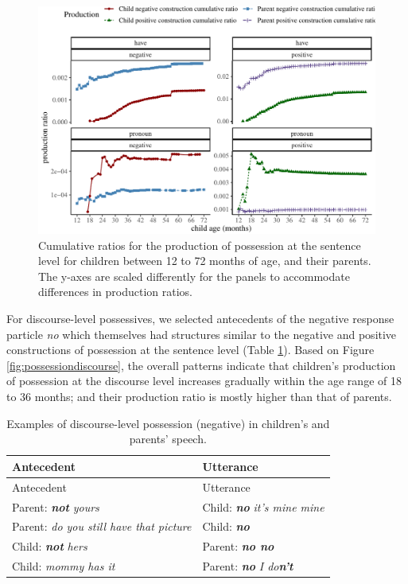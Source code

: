 \documentclass[
  english,
  man,floatsintext]{apa6}
\begin{document}
\begin{figure}[H]

{\centering \includegraphics{neg_construction_article_files/figure-latex/possession-1} 

}

\caption{Cumulative ratios for the production of possession at the sentence level for children between 12 to 72 months of age, and their parents. The y-axes are scaled differently for the panels to accommodate differences in production ratios.}\label{fig:possession}
\end{figure}

For discourse-level possessives, we selected antecedents of the negative response particle \emph{no} which themselves had structures similar to the negative and positive constructions of possession at the sentence level (Table \ref{tab:dispossess}). Based on Figure \ref{fig:possessiondiscourse}, the overall patterns indicate that children's production of possession at the discourse level increases gradually within the age range of 18 to 36 months; and their production ratio is mostly higher than that of parents.

\begin{longtable}[]{@{}ll@{}}
\caption{\label{tab:dispossess} Examples of discourse-level possession (negative) in children's and parents' speech.}\tabularnewline
\toprule
Antecedent & Utterance \\
\midrule
\endfirsthead
\toprule
Antecedent & Utterance \\
\midrule
\endhead
Parent: \textbf{\emph{not}} \emph{yours} & Child: \textbf{\emph{no}} \emph{it's mine mine} \\
Parent: \emph{do you still have that picture} & Child: \textbf{\emph{no}} \\
Child: \textbf{\emph{not}} \emph{hers} & Parent: \textbf{\emph{no no}} \\
Child: \emph{mommy has it} & Parent: \textbf{\emph{no}} \emph{I do}\textbf{\emph{n't}} \\
\bottomrule
\end{longtable}
\end{document}
